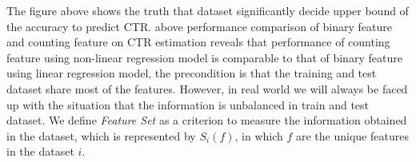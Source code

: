 \fi

The figure above shows the truth that dataset significantly decide upper bound of the accuracy to predict CTR. above performance comparison of binary feature and counting feature on CTR estimation reveals that performance of counting feature using non-linear regression model is comparable to that of binary feature using linear regression model, the precondition is that the training and test dataset share most of the features. However, in real world we will always be faced up with the situation that the information is unbalanced in train and test dataset. We define \textit{Feature Set} as a criterion to measure the information obtained in the dataset, which is represented by  \(S_i(f)\), in which \(f\) are the unique features in the dataset \(i\).\vspace{5mm}

